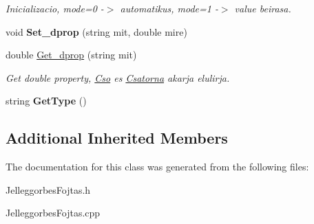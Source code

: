 \begin{DoxyCompactItemize}
\begin{DoxyCompactList}\small\item\em Inicializacio, mode=0 -\/$>$ automatikus, mode=1 -\/$>$ value beirasa. \end{DoxyCompactList}\item 
void {\bfseries Set\+\_\+dprop} (string mit, double mire)\hypertarget{class_jelleggorbes_fojtas_a1af41ea01aa004c5c709fed5760f1de1}{}\label{class_jelleggorbes_fojtas_a1af41ea01aa004c5c709fed5760f1de1}

\item 
double \hyperlink{class_jelleggorbes_fojtas_ab5e5487da5f674affde45438021c0967}{Get\+\_\+dprop} (string mit)\hypertarget{class_jelleggorbes_fojtas_ab5e5487da5f674affde45438021c0967}{}\label{class_jelleggorbes_fojtas_ab5e5487da5f674affde45438021c0967}

\begin{DoxyCompactList}\small\item\em Get double property, \hyperlink{class_cso}{Cso} es \hyperlink{class_csatorna}{Csatorna} akarja elulirja. \end{DoxyCompactList}\item 
string {\bfseries Get\+Type} ()\hypertarget{class_jelleggorbes_fojtas_a99692fcbf4be938803671901230f11ae}{}\label{class_jelleggorbes_fojtas_a99692fcbf4be938803671901230f11ae}

\end{DoxyCompactItemize}
\subsection*{Additional Inherited Members}


The documentation for this class was generated from the following files\+:\begin{DoxyCompactItemize}
\item 
Jelleggorbes\+Fojtas.\+h\item 
Jelleggorbes\+Fojtas.\+cpp\end{DoxyCompactItemize}
